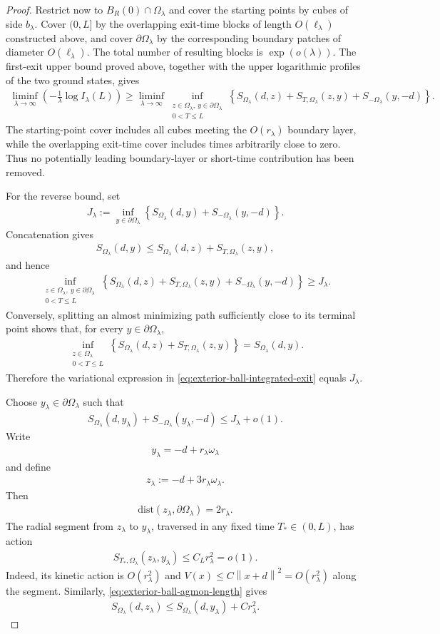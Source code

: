 \documentclass[a4paper,10pt]{article}
\numberwithin{equation}{section}
\theoremstyle{plain}
\theoremstyle{plain}
\theoremstyle{plain}
\theoremstyle{plain}
\theoremstyle{plain}
\theoremstyle{remark}
\theoremstyle{definition}
\newcommand\norm[1]{\left\lVert#1\right\rVert}
\newcommand{\dist}{\mathrm{dist}}
\newcommand{\eq}[1]{\begin{align*}#1\end{align*}}
\newcommand{\eql}[1]{\begin{align}#1\end{align}}
\newcommand{\br}[1]{\left(#1\right)}
\begin{document}
\begin{proof}
Restrict now to $B_R(0)\cap\Omega_\lambda$ and cover the starting
points by cubes of side $b_\lambda$. Cover $(0,L]$ by the overlapping
exit-time blocks of length $O(\ell_\lambda)$ constructed above, and
cover $\partial\Omega_\lambda$ by the corresponding boundary patches
of diameter $O(\ell_\lambda)$. The total number of resulting blocks is
$\exp(o(\lambda))$. The first-exit upper bound proved above, together
with the upper logarithmic profiles of the two ground states, gives
\eq{
\liminf_{\lambda\to\infty}
\left(
-\frac1\lambda
\log
I_\lambda(L)
\right)
\geq
\liminf_{\lambda\to\infty}
\inf_{\substack{
z\in\Omega_\lambda,\ 
y\in\partial\Omega_\lambda\\
0<T\leq L
}}
\left\{
S_{\Omega_\lambda}(d,z)
+
S_{T,\Omega_\lambda}(z,y)
+
S_{-\Omega_\lambda}(y,-d)
\right\}.
}
The starting-point cover includes all cubes meeting the
$O(r_\lambda)$ boundary layer, while the overlapping exit-time cover
includes times arbitrarily close to zero. Thus no potentially leading
boundary-layer or short-time contribution has been removed.

For the reverse bound, set
\eq{
J_\lambda
:=
\inf_{y\in\partial\Omega_\lambda}
\left\{
S_{\Omega_\lambda}(d,y)
+
S_{-\Omega_\lambda}(y,-d)
\right\}.
}
Concatenation gives
\eq{
S_{\Omega_\lambda}(d,y)
\leq
S_{\Omega_\lambda}(d,z)
+
S_{T,\Omega_\lambda}(z,y),
}
and hence
\eq{
\inf_{\substack{
z\in\Omega_\lambda,\ 
y\in\partial\Omega_\lambda\\
0<T\leq L
}}
\left\{
S_{\Omega_\lambda}(d,z)
+
S_{T,\Omega_\lambda}(z,y)
+
S_{-\Omega_\lambda}(y,-d)
\right\}
\geq
J_\lambda.
}
Conversely, splitting an almost minimizing path sufficiently close to
its terminal point shows that, for every
$y\in\partial\Omega_\lambda$,
\eq{
\inf_{\substack{
z\in\Omega_\lambda\\
0<T\leq L
}}
\left\{
S_{\Omega_\lambda}(d,z)
+
S_{T,\Omega_\lambda}(z,y)
\right\}
=
S_{\Omega_\lambda}(d,y).
}
Therefore the variational expression in
\cref{eq:exterior-ball-integrated-exit} equals $J_\lambda$.

Choose $y_\lambda\in\partial\Omega_\lambda$ such that
\eq{
S_{\Omega_\lambda}(d,y_\lambda)
+
S_{-\Omega_\lambda}(y_\lambda,-d)
\leq
J_\lambda
+
o(1).
}
Write
\eq{
y_\lambda
=
-d
+
r_\lambda\omega_\lambda
}
and define
\eq{
z_\lambda
:=
-d
+
3r_\lambda\omega_\lambda.
}
Then
\eq{
\dist\br{
z_\lambda,
\partial\Omega_\lambda
}
=
2r_\lambda.
}
The radial segment from $z_\lambda$ to $y_\lambda$, traversed in any
fixed time $T_*\in(0,L)$, has action
\eql{
S_{T_*,\Omega_\lambda}(z_\lambda,y_\lambda)
\leq
C_Lr_\lambda^2
=
o(1).
\label{eq:exterior-ball-short-exit-segment}
}
Indeed, its kinetic action is $O(r_\lambda^2)$ and
$V(x)\leq C\norm{x+d}^2=O(r_\lambda^2)$ along the segment. Similarly,
\cref{eq:exterior-ball-agmon-length} gives
\eql{
S_{\Omega_\lambda}(d,z_\lambda)
\leq
S_{\Omega_\lambda}(d,y_\lambda)
+
Cr_\lambda^2.
\label{eq:exterior-ball-boundary-layer-profile}
}


\end{proof}
\end{document}
